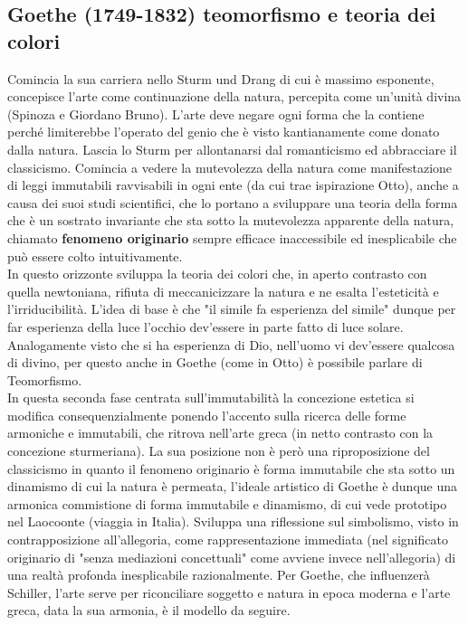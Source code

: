 \documentclass[10pt,a4paper]{article}
\begin{document}
\subsection{Goethe (1749-1832) teomorfismo e teoria dei colori}
Comincia la sua carriera nello Sturm und Drang di cui è massimo esponente, concepisce l'arte come continuazione della natura, percepita come un'unità divina (Spinoza e Giordano Bruno). L'arte deve negare ogni forma che la contiene perché limiterebbe l'operato del genio che è visto kantianamente come donato dalla natura. Lascia lo Sturm per allontanarsi dal romanticismo ed abbracciare il classicismo. Comincia a vedere la mutevolezza della natura come manifestazione di leggi immutabili ravvisabili in ogni ente (da cui trae ispirazione Otto), anche a causa dei suoi studi scientifici, che lo portano a sviluppare una teoria della forma che è un sostrato invariante che sta sotto la mutevolezza apparente della natura, chiamato \textbf{fenomeno originario} sempre efficace inaccessibile ed inesplicabile che può essere colto intuitivamente.\\
In questo orizzonte sviluppa la teoria dei colori che, in aperto contrasto con quella newtoniana, rifiuta di meccanicizzare la natura e ne esalta l'esteticità e l'irriducibilità. L'idea di base è che "il simile fa esperienza del simile" dunque per far esperienza della luce l'occhio dev'essere in parte fatto di luce solare. Analogamente visto che si ha esperienza di Dio, nell'uomo vi dev'essere qualcosa di divino, per questo anche in Goethe (come in Otto) è possibile parlare di Teomorfismo.\\
In questa seconda fase centrata sull'immutabilità la concezione estetica si modifica consequenzialmente ponendo l'accento sulla ricerca delle forme armoniche e immutabili, che ritrova nell'arte greca (in netto contrasto con la concezione sturmeriana). La sua posizione non è però una riproposizione del classicismo in quanto il fenomeno originario è forma immutabile che sta sotto un dinamismo di cui la natura è permeata, l'ideale artistico di Goethe è dunque una armonica commistione di forma immutabile e dinamismo, di cui vede prototipo nel Laocoonte (viaggia in Italia). Sviluppa una riflessione sul simbolismo, visto in contrapposizione all'allegoria, come rappresentazione immediata (nel significato originario di "senza mediazioni concettuali" come avviene invece nell'allegoria) di una realtà profonda inesplicabile razionalmente. Per Goethe, che influenzerà Schiller, l'arte serve per riconciliare soggetto e natura in epoca moderna e l'arte greca, data la sua armonia, è il modello da seguire.
\end{document}
